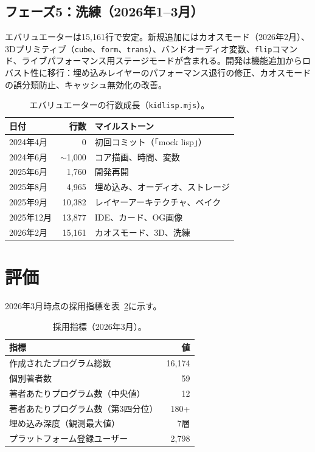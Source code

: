 \documentclass[10pt,letterpaper,twocolumn]{article}
\begin{document}
\subsection{フェーズ5：洗練（2026年1--3月）}

エバリュエーターは15,161行で安定。新規追加にはカオスモード（2026年2月）、3Dプリミティブ（\texttt{cube}、\texttt{form}、\texttt{trans}）、バンドオーディオ変数、\texttt{flip}コマンド、ライブパフォーマンス用ステージモードが含まれる。開発は機能追加からロバスト性に移行：埋め込みレイヤーのパフォーマンス退行の修正、カオスモードの誤分類防止、キャッシュ無効化の改善。

\begin{table}[h]
\small
\centering
\begin{tabular}{lrl}
\toprule
\textbf{日付} & \textbf{行数} & \textbf{マイルストーン} \\
\midrule
2024年4月 & 0 & 初回コミット（「mock lisp」） \\
2024年6月 & $\sim$1{,}000 & コア描画、時間、変数 \\
2025年6月 & 1{,}760 & 開発再開 \\
2025年8月 & 4{,}965 & 埋め込み、オーディオ、ストレージ \\
2025年9月 & 10{,}382 & レイヤーアーキテクチャ、ベイク \\
2025年12月 & 13{,}877 & IDE、カード、OG画像 \\
2026年2月 & 15{,}161 & カオスモード、3D、洗練 \\
\bottomrule
\end{tabular}
\caption{エバリュエーターの行数成長（\texttt{kidlisp.mjs}）。}
\label{tab:growth}
\end{table}

\section{評価}
\label{sec:evaluation}

2026年3月時点の採用指標を表~\ref{tab:adoption}に示す。

\begin{table}[h]
\small
\centering
\begin{tabular}{lr}
\toprule
\textbf{指標} & \textbf{値} \\
\midrule
作成されたプログラム総数 & 16,174 \\
個別著者数 & 59 \\
著者あたりプログラム数（中央値） & 12 \\
著者あたりプログラム数（第3四分位） & 180+ \\
埋め込み深度（観測最大値） & 7層 \\
プラットフォーム登録ユーザー & 2,798 \\
\bottomrule
\end{tabular}
\caption{採用指標（2026年3月）。}
\label{tab:adoption}
\end{table}
\end{document}
